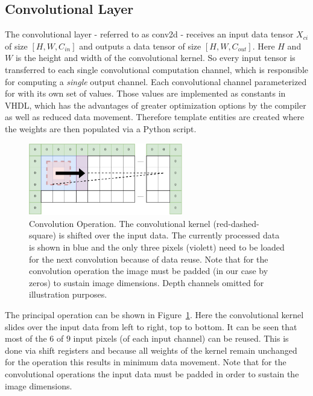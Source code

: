 \subsection{Convolutional Layer}

The convolutional layer - referred to as conv2d - receives an input data tensor $X_{ci} $ of size $[H, W, C_{in}]$ and outputs a data tensor of size $[H,W,C_{out}]$. Here $H$ and $W$ is the height and width of the convolutional kernel. So every input tensor is transferred to each single convolutional computation channel, which is responsible for computing a \emph{single} output channel. Each convolutional channel parameterized for with its own set of values. Those values are implemented as constants in VHDL, which has the advantages of greater optimization options by the compiler as well as reduced data movement. Therefore template entities are created where the weights are then populated via a Python script.

\begin{figure}[hb]
	\centering
	\includegraphics[width=0.6\textwidth]{img/convolution.pdf}
	\caption[Convolution Operation]{Convolution Operation. The convolutional kernel (red-dashed-square) is shifted over the input data. The currently processed data is shown in blue and the only three pixels (violett) need to be loaded for the next convolution because of data reuse. Note that for the convolution operation the image must be padded (in our case by zeros) to sustain image dimensions. Depth channels omitted for illustration purposes.}
	\label{fig:hw-conv-operation}
\end{figure}

The principal operation can be shown in Figure~\ref{fig:hw-conv-operation}. Here the convolutional kernel slides over the input data from left to right, top to bottom. It can be seen that most of the $6$ of $9$ input pixels (of each input channel) can be reused. This is done via shift registers and because all weights of the kernel remain unchanged for the operation this results in minimum data movement. Note that for the convolutional operations the input data must be padded in order to sustain the image dimensions.


